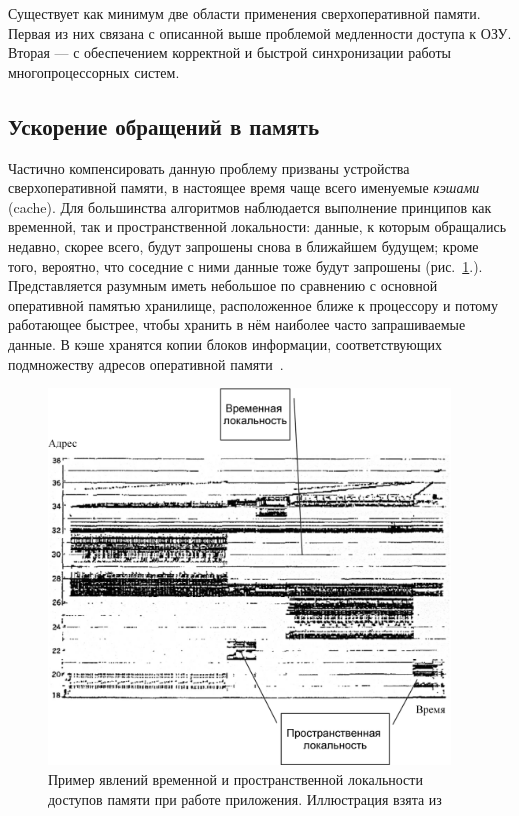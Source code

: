 Существует как минимум две области применения сверхоперативной памяти. Первая из них связана с описанной выше проблемой медленности доступа к ОЗУ. Вторая --- с обеспечением корректной и быстрой синхронизации работы многопроцессорных систем.

\subsection{Ускорение обращений в память}

Частично компенсировать данную проблему призваны устройства сверхоперативной памяти, в настоящее время чаще всего именуемые \textit{кэшами} (\abbr cache). Для большинства алгоритмов наблюдается выполнение принципов как временной, так  и пространственной  локальности: данные, к которым обращались недавно, скорее всего, будут запрошены снова в ближайшем будущем; кроме того, вероятно, что соседние с ними данные тоже будут запрошены (рис.~\ref{fig:locality}.). Представляется разумным иметь небольшое по сравнению с основной оперативной памятью хранилище, расположенное ближе к процессору и потому работающее быстрее, чтобы хранить в нём наиболее часто запрашиваемые данные. В кэше хранятся копии блоков информации, соответствующих подмножеству адресов оперативной памяти~\cite{ulrich-cpumemory, ulrich-cpumemory-rus}.

\begin{figure}[htb]
    \centering
    \includegraphics[width=0.95\textwidth]{./locality-crop.pdf}
    \caption[Пример явлений временной и пространственной локальности]{Пример явлений временной и пространственной локальности доступов памяти при работе приложения. Иллюстрация взята из~\cite{DBLP:journals/ibmsj/HatfieldG71}}
    \label{fig:locality}
\end{figure}


